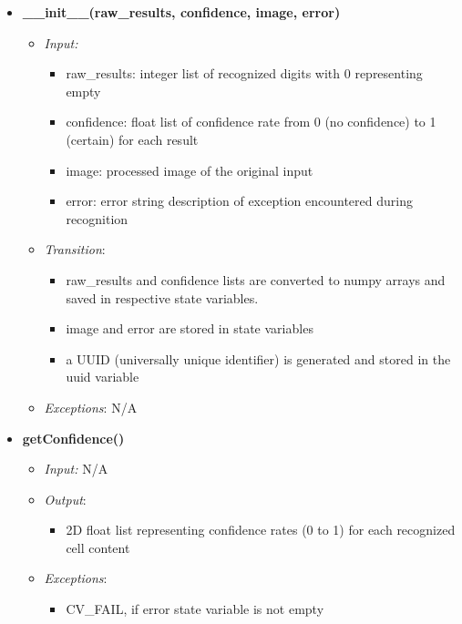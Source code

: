 \documentclass[11pt]{article}
\begin{document}
		\begin{itemize}
		    \item \textbf{\_\_init\_\_(raw\_results, confidence, image, error)}
		\begin{itemize}
		    \item[] \textit{Input: }
			\begin{itemize}
		        \item raw\_results: integer list of recognized digits with 0 representing empty
		        \item confidence: float list of confidence rate from 0 (no confidence) to 1 (certain) for each result
		        \item image: processed image of the original input
		        \item error: error string description of exception encountered during recognition
		    \end{itemize}	    
		    
		    \item[] \textit{Transition}: 
		    \begin{itemize}
		        \item raw\_results and confidence lists are converted to numpy arrays and saved in respective state variables.
		        \item image and error are stored in state variables
		        \item a UUID (universally unique identifier) is generated and stored in the uuid variable
		    \end{itemize}
		    
		    \item[] \textit{Exceptions}:
		    N/A
		\end{itemize}
		
		
		\item \textbf{getConfidence()}
		\begin{itemize}
		    \item[] \textit{Input: } N/A
		    
		    \item[] \textit{Output}: 
		    \begin{itemize}
		        \item 2D float list representing confidence rates (0 to 1) for each recognized cell content
		    \end{itemize}
		    
		    \item[] \textit{Exceptions}:
		    \begin{itemize}
		        \item CV\_FAIL, if error state variable is not empty
		    \end{itemize}
		\end{itemize}


\end{itemize}
\end{document}
